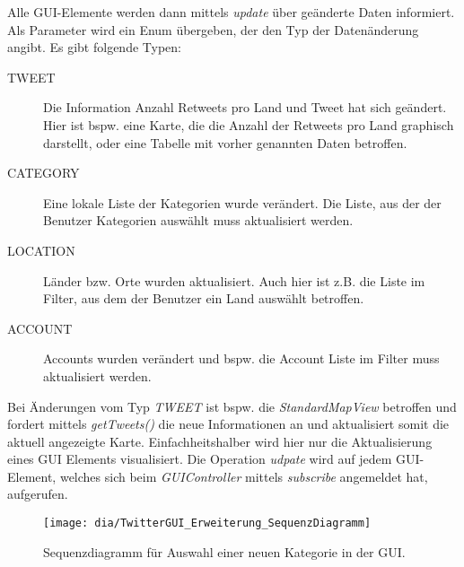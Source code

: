 Alle GUI-Elemente werden dann mittels \emph{update} über geänderte Daten informiert. Als Parameter wird ein Enum übergeben, der den Typ der Datenänderung angibt. Es gibt folgende Typen:
\begin{description}
	\item[TWEET] Die Information Anzahl Retweets pro Land und Tweet hat sich geändert. Hier ist bspw. eine Karte, die die Anzahl der Retweets pro Land graphisch darstellt, oder eine Tabelle mit vorher genannten Daten betroffen. 
	\item[CATEGORY] Eine lokale Liste der Kategorien wurde verändert. Die Liste, aus der der Benutzer Kategorien auswählt muss aktualisiert werden.
	\item[LOCATION] Länder bzw. Orte wurden aktualisiert. Auch hier ist z.B. die Liste im Filter, aus dem der Benutzer ein Land auswählt betroffen.
	\item[ACCOUNT] Accounts wurden verändert und bspw. die Account Liste im Filter muss aktualisiert werden.
\end{description}
Bei Änderungen vom Typ \emph{TWEET} ist bspw. die \emph{StandardMapView} betroffen und fordert mittels \emph{getTweets()} die neue Informationen an und aktualisiert somit die aktuell angezeigte Karte. Einfachheitshalber wird hier nur die Aktualisierung eines GUI Elements visualisiert. Die Operation \emph{udpate} wird auf jedem GUI-Element, welches sich beim \emph{GUIController} mittels \emph{subscribe} angemeldet hat, aufgerufen.
\begin{figure}[h!]
	\centering
	\texttt{[image: dia/TwitterGUI\_Erweiterung\_SequenzDiagramm]}
	\caption{Sequenzdiagramm für Auswahl einer neuen Kategorie in der GUI.}
	\label{fig:GUISeq}
\end{figure}
